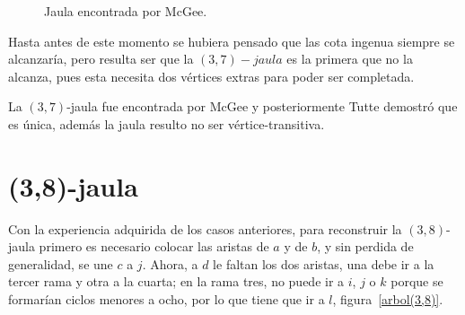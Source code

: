 \documentclass[12pt]{book}
\theoremstyle{definition}
\begin{document}
\begin{figure}
  \centering
  \caption{Jaula encontrada por McGee.} \label{jaula(3,7)}
\end{figure}



Hasta antes de este momento se hubiera pensado que las cota ingenua
siempre se alcanzaría, pero resulta ser que la $(3,7)-jaula$ es la
primera que no la alcanza, pues esta necesita dos vértices extras para
poder ser completada.

La $(3,7)$-jaula fue encontrada por McGee y posteriormente Tutte
demostró que es única, además la jaula resulto no ser
vértice-transitiva.


\section{(3,8)-jaula}

Con la experiencia adquirida de los casos anteriores, para reconstruir
la $(3,8)$-jaula primero es necesario colocar las aristas de $a$ y de
$b$, y sin perdida de generalidad, se une $c$ a $j$. Ahora, a $d$ le
faltan los dos aristas, una debe ir a la tercer rama y otra a la
cuarta; en la rama tres, no puede ir a $i$, $j$ o $k$ porque se
formarían ciclos menores a ocho, por lo que tiene que ir a $l$,
figura~\ref{arbol(3,8)}.
\end{document}
